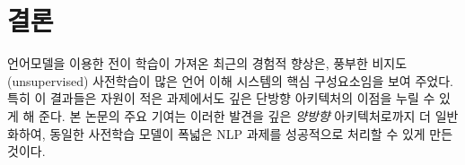 \section{결론}
언어모델을 이용한 전이 학습이 가져온 최근의 경험적 향상은, 풍부한 비지도(unsupervised) 사전학습이 많은 언어 이해 시스템의 핵심 구성요소임을 보여 주었다. 특히 이 결과들은 자원이 적은 과제에서도 깊은 단방향 아키텍처의 이점을 누릴 수 있게 해 준다. 본 논문의 주요 기여는 이러한 발견을 깊은 \emph{양방향} 아키텍처로까지 더 일반화하여, 동일한 사전학습 모델이 폭넓은 NLP 과제를 성공적으로 처리할 수 있게 만든 것이다.
